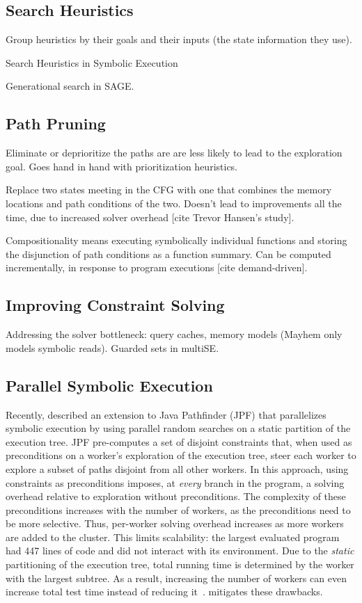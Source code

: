 \subsection{Search Heuristics}

Group heuristics by their goals and their inputs (the state information they use).

Search Heuristics in Symbolic Execution

Generational search in SAGE.

\subsection{Path Pruning}

Eliminate or deprioritize the paths are are less likely to lead to the exploration goal.  Goes hand in hand with prioritization heuristics.

Replace two states meeting in the CFG with one that combines the memory locations and path conditions of the two.  Doesn't lead to improvements all the time, due to increased solver overhead [cite Trevor Hansen's study].

Compositionality means executing symbolically individual functions and storing the disjunction of path conditions as a function summary.  Can be computed incrementally, in response to program executions [cite demand-driven].

\subsection{Improving Constraint Solving}

Addressing the solver bottleneck: query caches, memory models (Mayhem only models symbolic reads). Guarded sets in multiSE.

\subsection{Parallel Symbolic Execution}

Recently, \cite{parallelSymbex} described an extension to Java Pathfinder (JPF) that parallelizes symbolic execution by using parallel random searches on a static partition of the execution tree.  JPF pre-computes a set of disjoint constraints that, when used as preconditions on a worker's exploration of the execution tree, steer each worker to explore a subset of paths disjoint from all other workers.  In this approach, using constraints as preconditions imposes, at {\em every} branch in the program, a solving overhead relative to exploration without preconditions.  The complexity of these preconditions increases with the number of workers, as the preconditions need to be more selective.  Thus, per-worker solving overhead increases as more workers are added to the cluster.  This limits scalability: the largest evaluated program had 447 lines of code and did not interact with its environment.  Due to the {\em static} partitioning of the execution tree, total running time is determined by the worker with the largest subtree.  As a result, increasing the number of workers can even increase total test time instead of reducing it~\cite{parallelSymbex}.  \cnine mitigates these drawbacks.

